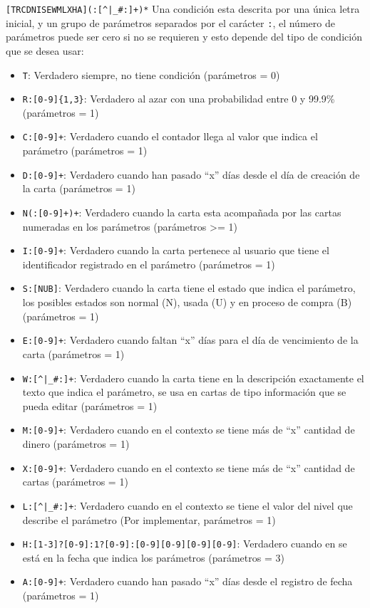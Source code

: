 \begin{definition}
	{\Large\color{blue} \verb/[TRCDNISEWMLXHA](:[^|_#:]+)*/}
	Una condición esta descrita por una única letra inicial, y un grupo de parámetros separados por el 
	carácter {\Large\color{blue} \verb/:/}, el número de parámetros puede ser cero si no se requieren y 
	esto depende del tipo de condición que se desea usar:

	\begin{itemize}
		\item {\Large\color{blue} \verb/T/}: Verdadero siempre, no tiene condición (parámetros = 0)
		\item {\Large\color{blue} \verb/R:[0-9]{1,3}/}: Verdadero al azar con una probabilidad entre 0 y 
			99.9\% (parámetros = 1)
		\item {\Large\color{blue} \verb/C:[0-9]+/}: Verdadero cuando el contador llega al valor que 
			indica el parámetro (parámetros = 1)
		\item {\Large\color{blue} \verb/D:[0-9]+/}: Verdadero cuando han pasado ``x'' días desde el día 
			de creación de la carta (parámetros = 1)
		\item {\Large\color{blue} \verb/N(:[0-9]+)+/}: Verdadero cuando la carta esta acompañada por las 
			cartas numeradas en los parámetros (parámetros >= 1)
		\item {\Large\color{blue} \verb/I:[0-9]+/}: Verdadero cuando la carta pertenece al usuario que 
			tiene el identificador registrado en el parámetro (parámetros = 1)
		\item {\Large\color{blue} \verb/S:[NUB]/}: Verdadero cuando la carta tiene el estado que 
			indica  el parámetro, los posibles estados son normal (N), usada (U) y en proceso de 
			compra (B) (parámetros = 1)
		\item {\Large\color{blue} \verb/E:[0-9]+/}: Verdadero cuando faltan ``x'' días para el día 
			de vencimiento de la carta (parámetros = 1)
		\item {\Large\color{blue} \verb/W:[^|_#:]+/}: Verdadero cuando la carta tiene en la descripción 
			exactamente el texto que indica el parámetro, se usa en cartas de tipo información que 
			se pueda editar (parámetros = 1)
		\item {\Large\color{blue} \verb/M:[0-9]+/}: Verdadero cuando en el contexto se tiene más de 
			``x'' cantidad de dinero (parámetros = 1)
		\item {\Large\color{blue} \verb/X:[0-9]+/}: Verdadero cuando en el contexto se tiene más de 
			``x'' cantidad de cartas (parámetros = 1)
		\item {\Large\color{blue} \verb/L:[^|_#:]+/}: Verdadero cuando en el contexto se tiene el valor
			del nivel que describe el parámetro (Por implementar, parámetros = 1)
		\item {\Large\color{blue} \verb/H:[1-3]?[0-9]:1?[0-9]:[0-9][0-9][0-9][0-9]/}: Verdadero cuando 
			en se está en la fecha que indica los parámetros (parámetros = 3)
		\item {\Large\color{blue} \verb/A:[0-9]+/}: Verdadero cuando han pasado ``x'' días desde el 
			registro de fecha (parámetros = 1)
	\end{itemize}
\end{definition}

